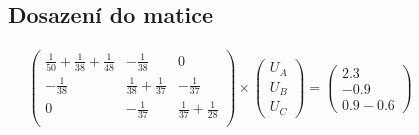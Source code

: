 \begin{figure}[h!]
    \subsection{Dosazení do matice}
    \begin{gather*}
        \begin{pmatrix}
            \frac{1}{50} + \frac{1}{38} + \frac{1}{48} & -\frac{1}{38} & 0 \\
            -\frac{1}{38} &  \frac{1}{38} + \frac{1}{37} & -\frac{1}{37}  \\
            0 & -\frac{1}{37} & \frac{1}{37} + \frac{1}{28} \\
        \end{pmatrix}
        \times
        \begin{pmatrix}
            U_A \\
            U_B \\
            U_C
        \end{pmatrix}
        =
        \begin{pmatrix}
            2.3 \\
            -0.9 \\
            0.9 - 0.6
        \end{pmatrix}
    \end{gather*}
\end{figure}

